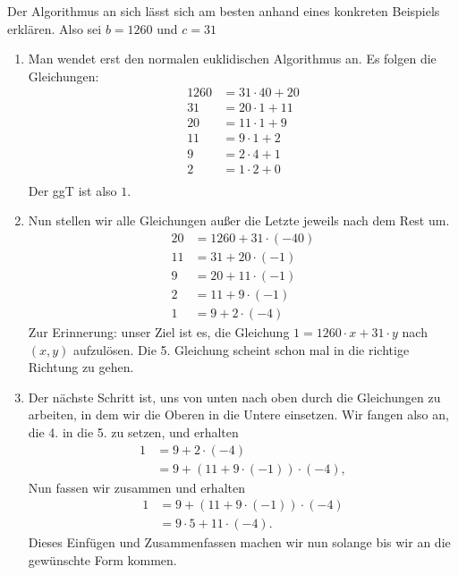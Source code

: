 \documentclass[11pt]{article}
\begin{document}
Der Algorithmus an sich l\"asst sich am besten anhand eines konkreten Beispiels erkl\"aren. Also sei $b=1260$ und $c=31$
\begin{enumerate}
    \item Man wendet erst den normalen euklidischen Algorithmus an. Es folgen die Gleichungen:
    \begin{align*}
        1260 &= 31 \cdot 40 + 20\\ 
        31 &= 20 \cdot 1 + 11\\ 
        20 &= 11 \cdot 1 + 9\\ 
        11 &= 9 \cdot 1 + 2\\ 
        9 &= 2 \cdot 4 + 1\\ 
        2 &= 1 \cdot 2 + 0\\ 
    \end{align*}
    Der ggT ist also $1$. 
    \pagebreak
    \item Nun stellen wir alle Gleichungen au{\ss}er die Letzte jeweils nach dem Rest um.
    \begin{align}
        20 &= 1260 + 31 \cdot (-40)\\ 
        11 &= 31 + 20 \cdot (-1)\\
        9 &= 20 + 11 \cdot (-1)\\
        2 &= 11 + 9 \cdot (-1)\\
        1 &= 9 + 2 \cdot (-4)
    \end{align}
    Zur Erinnerung: unser Ziel ist es, die Gleichung $1 = 1260 \cdot x + 31 \cdot y$ nach $(x,y)$ aufzul\"osen.
    Die 5. Gleichung scheint schon mal in die richtige Richtung zu gehen.
    \item Der n\"achste Schritt ist, uns von unten nach oben durch die Gleichungen zu arbeiten, in dem wir die Oberen in die Untere 
        einsetzen. Wir fangen also an, die 4. in die 5. zu setzen, und erhalten
        \begin{align*}
            1 &= 9 + 2 \cdot (-4)\\
              &= 9 + (11+9\cdot(-1)) \cdot (-4),
        \end{align*}
        Nun fassen wir zusammen und erhalten
        \begin{align*}
            1 &= 9 + (11+9\cdot(-1)) \cdot (-4)\\
              &= 9 \cdot 5 + 11 \cdot (-4).
        \end{align*}
        Dieses Einf\"ugen und Zusammenfassen machen wir nun solange bis wir an die gew\"unschte Form kommen.
        \begin{align*}

\end{align*}
\end{enumerate}
\end{document}
